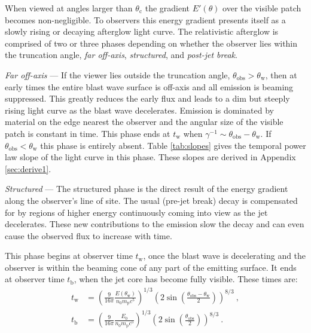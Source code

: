 \documentclass[twocolumn]{aastex62}
\newcommand{\tW}{\ensuremath{t_{\mathrm{w}}}}
\newcommand{\tb}{\ensuremath{t_{\mathrm{b}}}}
\newcommand{\thobs}{\ensuremath{\theta_{\mathrm{obs}}}}
\newcommand{\thW}{\ensuremath{\theta_{\mathrm{w}}}}
\newcommand{\thC}{\ensuremath{\theta_{\mathrm{c}}}}
\newcommand{\Mp}{\ensuremath{m_{\mathrm{p}}}}
\begin{document}
When viewed at angles larger than $\thC$ the gradient $E'(\theta)$ over the visible patch becomes non-negligible.  To observers this energy gradient presents itself as a slowly rising or decaying afterglow light curve. The relativistic afterglow is comprised of two or three phases depending on whether the observer lies within the truncation angle, \emph{far off-axis}, \emph{structured}, and \emph{post-jet break}.

\emph{Far off-axis} --- If the viewer lies outside the truncation angle, $\thobs > \thW$, then at early times the entire blast wave surface is off-axis and all emission is beaming suppressed.  This greatly reduces the early flux and leads to a dim but steeply rising light curve as the blast wave decelerates.  Emission is dominated by material on the edge nearest the observer and the angular size of the visible patch is constant in time.  This phase ends at $\tW$ when $\gamma^{-1} \sim \thobs-\thW$.  If $\thobs < \thW$ this phase is entirely absent.  Table \ref{tab:slopes} gives the temporal power law slope of the light curve in this phase.  These slopes are derived in Appendix \ref{sec:derive1}.

\emph{Structured} --- The structured phase is the direct result of the energy gradient along the observer's line of site.  The usual (pre-jet break) decay is compensated for by regions of higher energy continuously coming into view as the jet decelerates.  These new contributions to the emission slow the decay and can even cause the observed flux to increase with time.

 This phase begins at observer time $\tW$, once the blast wave is decelerating and the observer is within the beaming cone of any part of the emitting surface.  It ends at observer time $\tb$, when the jet core has become fully visible.  These times are:
\begin{align}
	\tW &= \left(\frac{9}{16\pi} \frac{E(\thW)}{n_0 \Mp c^5}\right)^{1/3} \left( 2 \sin \left(\frac{\thobs-\thW}{2}\right)\right)^{8/3} \ ,\label{eq:tw} \\
	\tb &= \left(\frac{9}{16\pi} \frac{E_0}{n_0 \Mp c^5}\right)^{1/3} \left( 2 \sin \left(\frac{\thobs}{2}\right)\right)^{8/3} \ .\label{eq:tb}
\end{align}
\end{document}
